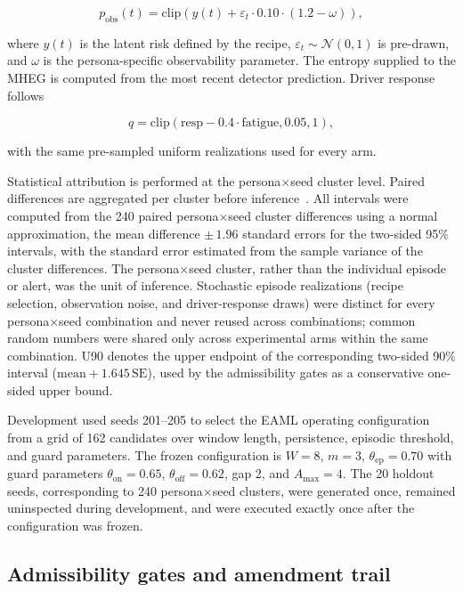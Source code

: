 \documentclass[conference]{IEEEtran}
\begin{document}
\[
p_{\mathrm{obs}}(t)=
\mathrm{clip}\!\left(
y(t)+\varepsilon_t\cdot0.10\cdot(1.2-\omega)
\right),
\]

where $y(t)$ is the latent risk defined by the recipe,
$\varepsilon_t\!\sim\!\mathcal{N}(0,1)$ is pre-drawn, and $\omega$ is
the persona-specific observability parameter. The entropy supplied to the
MHEG is computed from the most recent detector prediction. Driver response
follows

\[
q=\mathrm{clip}(\mathrm{resp}-0.4\cdot\mathrm{fatigue},0.05,1),
\]

with the same pre-sampled uniform realizations used for every arm.

Statistical attribution is performed at the
persona$\times$seed cluster level. Paired differences are aggregated per
cluster before inference~\cite{law2015}. All intervals were computed
from the 240 paired persona$\times$seed cluster differences using a
normal approximation, the mean difference $\pm\,1.96$ standard errors
for the two-sided 95\% intervals, with the standard error estimated
from the sample variance of the cluster differences. The
persona$\times$seed cluster, rather than the individual episode or
alert, was the unit of inference. Stochastic episode realizations
(recipe selection, observation noise, and driver-response draws) were
distinct for every persona$\times$seed combination and never reused
across combinations; common random numbers were shared only across
experimental arms within the same combination. U90 denotes the upper endpoint of the
corresponding two-sided 90\% interval
($\text{mean}+1.645\,\text{SE}$), used by the admissibility gates as a
conservative one-sided upper bound.

Development used seeds 201--205 to select the EAML operating
configuration from a grid of 162 candidates over window length,
persistence, episodic threshold, and guard parameters. The frozen
configuration is $W{=}8$, $m{=}3$, $\theta_{\mathrm{ep}}{=}0.70$ with
guard parameters $\theta_{\mathrm{on}}{=}0.65$,
$\theta_{\mathrm{off}}{=}0.62$, gap 2, and $A_{\max}{=}4$.
The 20 holdout seeds, corresponding to 240 persona$\times$seed clusters,
were generated once, remained uninspected during development, and were
executed exactly once after the configuration was frozen.

\subsection{Admissibility gates and amendment trail}
\end{document}
